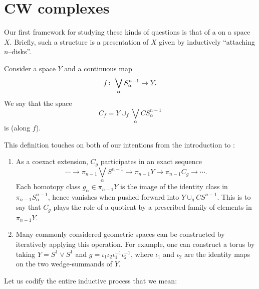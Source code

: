\section{CW complexes}

Our first framework for studying these kinds of questions is that of a  on a space $X$.
Briefly, such a structure is a presentation of $X$ given by inductively ``attaching $n$--disks''.

\begin{definition}
Consider a space $Y$ and a continuous map \[f\colon\thinspace \bigvee_\alpha S^{n-1}_\alpha \to Y.\]
We say that the space \[C_f = Y \cup_f \bigvee_\alpha CS^{n-1}_\alpha\] is  (along $f$).
\end{definition}

\noindent
This definition touches on both of our intentions from the introduction to :
\begin{enumerate}
    \item
    As a coexact extension,
    $C_g$ participates in an exact sequence \[\cdots \to \pi_{n-1} \bigvee_\alpha S^{n-1} \to \pi_{n-1} Y \to \pi_{n-1} C_g \to \cdots.\]
    Each homotopy class $g_\alpha \in \pi_{n-1} Y$ is the image of the identity class in $\pi_{n-1} S^{n-1}_\alpha$, hence vanishes when pushed forward into $Y \cup_g CS^{n-1}$.
    This is to say that $C_g$ plays the role of a quotient by a prescribed family of elements in $\pi_{n-1} Y$.
    \item
    Many commonly considered geometric spaces can be constructed by iteratively applying this operation.
    For example, one can construct a torus by taking $Y = S^1 \vee S^1$ and $g = \iota_1 \iota_2 \iota_1^{-1} \iota_2^{-1}$, where $\iota_1$ and $\iota_2$ are the identity maps on the two wedge-summands of $Y$.
\end{enumerate}

Let us codify the entire inductive process that we mean:


